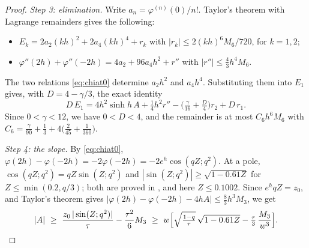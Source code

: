 \documentclass[11pt]{article}
\theoremstyle{plain}
\theoremstyle{definition}
\theoremstyle{remark}
\theoremstyle{plain}\newtheorem*{maintheorem}{Main Theorem}
\begin{document}
\begin{proof}
\emph{Step 3: elimination.} Write $a_n=\varphi^{(n)}(0)/n!$. Taylor's theorem with Lagrange
remainders gives the following:
\begin{itemize}
\item $E_k=2a_2(kh)^2+2a_4(kh)^4+r_k$ with $|r_k|\le2(kh)^6M_6/720$, for $k=1,2$;
\item $\varphi''(2h)+\varphi''(-2h)=4a_2+96a_4h^2+r''$ with $|r''|\le\tfrac43h^4M_6$.
\end{itemize}
The two relations \eqref{eq:chiat0} determine $a_2h^2$ and $a_4h^4$. Substituting them into $E_1$
gives, with $D=4-\gamma/3$, the exact identity
\[
   D\,E_1=4h^2\sinh h\,A+\tfrac14h^2r''-\bigl(\tfrac\gamma{16}+\tfrac D4\bigr)r_2+D\,r_1 .
\]
Since $0<\gamma<12$, we have $0<D<4$, and the remainder is at most
$C_6h^6M_6$ with $C_6=\tfrac\gamma{90}+\tfrac13+4\bigl(\tfrac2{45}+\tfrac1{360}\bigr)$.

\emph{Step 4: the slope.} By \eqref{eq:chiat0}, $\varphi(2h)-\varphi(-2h)=-2\varphi(-2h)
=-2e^h\cos(qZ;q^2)$. At a pole, $\cos(qZ;q^2)=qZ\sin(Z;q^2)$ and
$|\sin(Z;q^2)|\ge\sqrt{1-0.61Z}$ for $Z\le\min(0.2,q/3)$; both are proved in
{\cite[proof of Proposition \textup{prop:selower}]{Bonfioli2026bB}}, and here
$Z\le0.1002$. Since $e^hqZ=z_0$, and Taylor's theorem gives
$|\varphi(2h)-\varphi(-2h)-4hA|\le\tfrac83h^3M_3$, we get
\[
   |A|\ \ge\ \frac{z_0\,|\sin(Z;q^2)|}{\tau}-\frac{\tau^2}6M_3
   \ \ge\ w\Bigl[\sqrt{\tfrac{1-q}\tau}\,\sqrt{1-0.61Z}-\tfrac\tau3\,\frac{M_3}{w^3}\Bigr].
\]


\end{proof}
\end{document}
